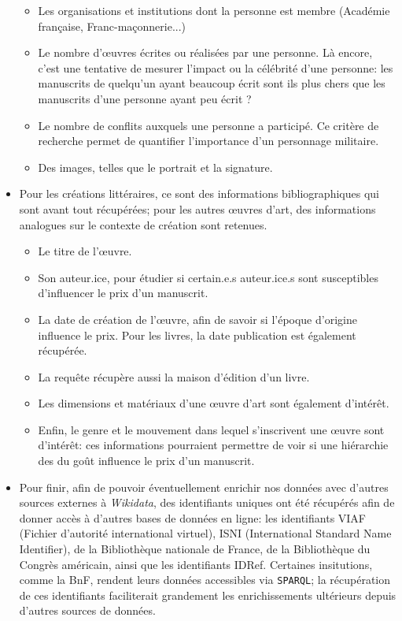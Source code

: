 \documentclass[a4paper, 12pt, twoside]{book}
\newcommand{\sparql}{\texttt{\gls{SPARQL}}}
\newcommand{\wkd}{\textit{Wikidata}}
\begin{document}
\begin{itemize}
\begin{itemize}
		\item Les organisations et institutions dont la personne est membre (Académie française, Franc-maçonnerie...)
		\item Le nombre d'œuvres écrites ou réalisées par une personne. Là encore, c'est une tentative de mesurer l'impact ou la célébrité d'une personne: les manuscrits de quelqu'un ayant beaucoup écrit sont ils plus chers que les manuscrits d'une personne ayant peu écrit ?
		\item Le nombre de conflits auxquels une personne a participé. Ce critère de recherche permet de quantifier l'importance d'un personnage militaire.
		\item Des images, telles que le portrait et la signature.
	\end{itemize}
	\item Pour les créations littéraires, ce sont des informations bibliographiques qui sont avant tout récupérées; pour les autres œuvres d'art, des informations analogues sur le contexte de création sont retenues.
	\begin{itemize}
		\item Le titre de l'œuvre.
		\item Son auteur.ice, pour étudier si certain.e.s auteur.ice.s sont susceptibles d'influencer le prix d'un manuscrit.
		\item La date de création de l'œuvre, afin de savoir si l'époque d'origine influence le prix. Pour les livres, la date publication est également récupérée.
		\item La requête récupère aussi la maison d'édition d'un livre.
		\item Les dimensions et matériaux d'une œuvre d'art sont également d'intérêt.
		\item Enfin, le genre et le mouvement dans lequel s'inscrivent une œuvre sont d'intérêt: ces informations pourraient permettre de voir si une hiérarchie des du goût influence le prix d'un manuscrit.
	\end{itemize}
	\item Pour finir, afin de pouvoir éventuellement enrichir nos données avec d'autres sources externes à \wkd{}, des identifiants uniques ont été récupérés afin de donner accès à d'autres bases de données en ligne: les identifiants VIAF (Fichier d'autorité international virtuel), ISNI (International Standard Name Identifier), de la Bibliothèque nationale de France, de la Bibliothèque du Congrès américain, ainsi que les identifiants IDRef. Certaines insitutions, comme la BnF, rendent leurs données accessibles via \sparql{}; la récupération de ces identifiants faciliterait grandement les enrichissements ultérieurs depuis d'autres sources de données.
\end{itemize}
\end{document}
